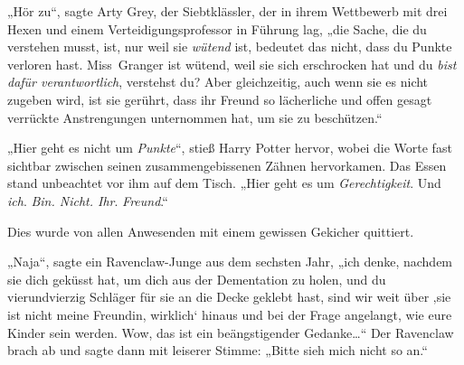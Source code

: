 „Hör zu“, sagte Arty Grey, der Siebtklässler, der in ihrem Wettbewerb mit drei Hexen und einem Verteidigungsprofessor in Führung lag, „die Sache, die du verstehen musst, ist, nur weil sie \emph{wütend} ist, bedeutet das nicht, dass du Punkte verloren hast. Miss~Granger ist wütend, weil sie sich erschrocken hat und du \emph{bist dafür verantwortlich}, verstehst du? Aber gleichzeitig, auch wenn sie es nicht zugeben wird, ist sie gerührt, dass ihr Freund so lächerliche und offen gesagt verrückte Anstrengungen unternommen hat, um sie zu beschützen.“

„Hier geht es nicht um \emph{Punkte}“, stieß Harry Potter hervor, wobei die Worte fast sichtbar zwischen seinen zusammengebissenen Zähnen hervorkamen. Das Essen stand unbeachtet vor ihm auf dem Tisch. „Hier geht es um \emph{Gerechtigkeit}. Und \emph{ich}. \emph{Bin. Nicht. Ihr}. \emph{Freund}.“

Dies wurde von allen Anwesenden mit einem gewissen Gekicher quittiert.

„Naja“, sagte ein Ravenclaw-Junge aus dem sechsten Jahr, „ich denke, nachdem sie dich geküsst hat, um dich aus der Dementation zu holen, und du vierundvierzig Schläger für sie an die Decke geklebt hast, sind wir weit über ‚sie ist nicht meine Freundin, wirklich‘ hinaus und bei der Frage angelangt, wie eure Kinder sein werden. Wow, das ist ein beängstigender Gedanke…“ Der Ravenclaw brach ab und sagte dann mit leiserer Stimme: „Bitte sieh mich nicht so an.“

